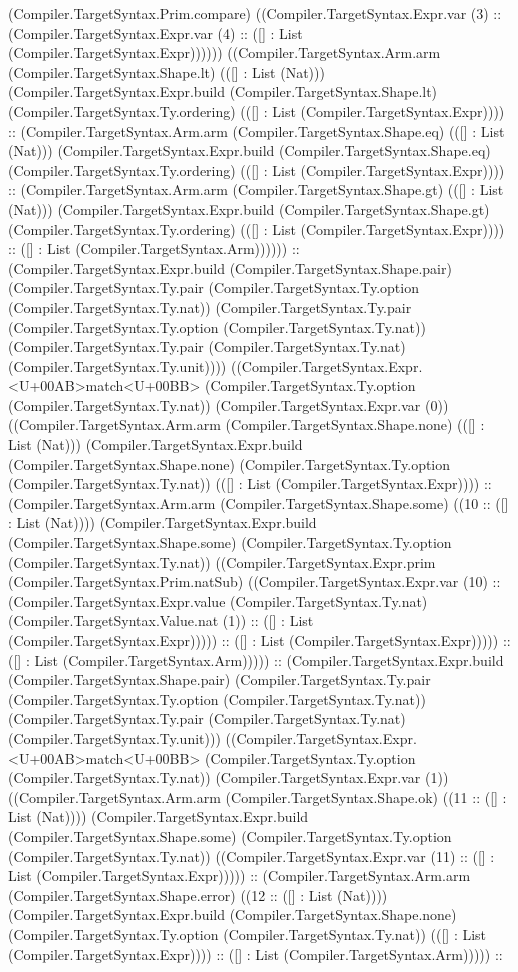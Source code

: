 \documentclass[11pt]{article}
\begin{document}
(Compiler.TargetSyntax.Prim.compare) ((Compiler.TargetSyntax.Expr.var (3) :: (Compiler.TargetSyntax.Expr.var (4) :: ([] : List (Compiler.TargetSyntax.Expr)))))) ((Compiler.TargetSyntax.Arm.arm (Compiler.TargetSyntax.Shape.lt) (([] : List (Nat))) (Compiler.TargetSyntax.Expr.build (Compiler.TargetSyntax.Shape.lt) (Compiler.TargetSyntax.Ty.ordering) (([] : List (Compiler.TargetSyntax.Expr)))) :: (Compiler.TargetSyntax.Arm.arm (Compiler.TargetSyntax.Shape.eq) (([] : List (Nat))) (Compiler.TargetSyntax.Expr.build (Compiler.TargetSyntax.Shape.eq) (Compiler.TargetSyntax.Ty.ordering) (([] : List (Compiler.TargetSyntax.Expr)))) :: (Compiler.TargetSyntax.Arm.arm (Compiler.TargetSyntax.Shape.gt) (([] : List (Nat))) (Compiler.TargetSyntax.Expr.build (Compiler.TargetSyntax.Shape.gt) (Compiler.TargetSyntax.Ty.ordering) (([] : List (Compiler.TargetSyntax.Expr)))) :: ([] : List (Compiler.TargetSyntax.Arm)))))) :: (Compiler.TargetSyntax.Expr.build (Compiler.TargetSyntax.Shape.pair) (Compiler.TargetSyntax.Ty.pair (Compiler.TargetSyntax.Ty.option (Compiler.TargetSyntax.Ty.nat)) (Compiler.TargetSyntax.Ty.pair (Compiler.TargetSyntax.Ty.option (Compiler.TargetSyntax.Ty.nat)) (Compiler.TargetSyntax.Ty.pair (Compiler.TargetSyntax.Ty.nat) (Compiler.TargetSyntax.Ty.unit)))) ((Compiler.TargetSyntax.Expr.<U+00AB>match<U+00BB> (Compiler.TargetSyntax.Ty.option (Compiler.TargetSyntax.Ty.nat)) (Compiler.TargetSyntax.Expr.var (0)) ((Compiler.TargetSyntax.Arm.arm (Compiler.TargetSyntax.Shape.none) (([] : List (Nat))) (Compiler.TargetSyntax.Expr.build (Compiler.TargetSyntax.Shape.none) (Compiler.TargetSyntax.Ty.option (Compiler.TargetSyntax.Ty.nat)) (([] : List (Compiler.TargetSyntax.Expr)))) :: (Compiler.TargetSyntax.Arm.arm (Compiler.TargetSyntax.Shape.some) ((10 :: ([] : List (Nat)))) (Compiler.TargetSyntax.Expr.build (Compiler.TargetSyntax.Shape.some) (Compiler.TargetSyntax.Ty.option (Compiler.TargetSyntax.Ty.nat)) ((Compiler.TargetSyntax.Expr.prim (Compiler.TargetSyntax.Prim.natSub) ((Compiler.TargetSyntax.Expr.var (10) :: (Compiler.TargetSyntax.Expr.value (Compiler.TargetSyntax.Ty.nat) (Compiler.TargetSyntax.Value.nat (1)) :: ([] : List (Compiler.TargetSyntax.Expr))))) :: ([] : List (Compiler.TargetSyntax.Expr))))) :: ([] : List (Compiler.TargetSyntax.Arm))))) :: (Compiler.TargetSyntax.Expr.build (Compiler.TargetSyntax.Shape.pair) (Compiler.TargetSyntax.Ty.pair (Compiler.TargetSyntax.Ty.option (Compiler.TargetSyntax.Ty.nat)) (Compiler.TargetSyntax.Ty.pair (Compiler.TargetSyntax.Ty.nat) (Compiler.TargetSyntax.Ty.unit))) ((Compiler.TargetSyntax.Expr.<U+00AB>match<U+00BB> (Compiler.TargetSyntax.Ty.option (Compiler.TargetSyntax.Ty.nat)) (Compiler.TargetSyntax.Expr.var (1)) ((Compiler.TargetSyntax.Arm.arm (Compiler.TargetSyntax.Shape.ok) ((11 :: ([] : List (Nat)))) (Compiler.TargetSyntax.Expr.build (Compiler.TargetSyntax.Shape.some) (Compiler.TargetSyntax.Ty.option (Compiler.TargetSyntax.Ty.nat)) ((Compiler.TargetSyntax.Expr.var (11) :: ([] : List (Compiler.TargetSyntax.Expr))))) :: (Compiler.TargetSyntax.Arm.arm (Compiler.TargetSyntax.Shape.error) ((12 :: ([] : List (Nat)))) (Compiler.TargetSyntax.Expr.build (Compiler.TargetSyntax.Shape.none) (Compiler.TargetSyntax.Ty.option (Compiler.TargetSyntax.Ty.nat)) (([] : List (Compiler.TargetSyntax.Expr)))) :: ([] : List (Compiler.TargetSyntax.Arm))))) :: 
\end{document}
